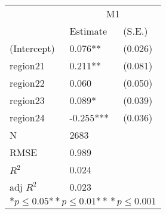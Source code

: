 \begin{tabular}{*{3}{l}}
\hline
                  & \multicolumn{2}{c}{M1}   \tabularnewline
                   &Estimate  &(S.E.)  \tabularnewline
 \hline
 \hline
   (Intercept)     &0.076**   &   (0.026) \tabularnewline
   region21        &0.211**   &   (0.081) \tabularnewline
   region22        &0.060   &   (0.050) \tabularnewline
   region23        &0.089*   &   (0.039) \tabularnewline
   region24        &-0.255***   &   (0.036) \tabularnewline
 \hline
 N                 &2683       &        \tabularnewline
 RMSE             &0.989         & \tabularnewline
 $R^2$             &0.024         & \tabularnewline
 adj $R^2$         &0.023         & \tabularnewline
 \hline
\hline
 
 \multicolumn{3}{c}{${*  p}\le 0.05$${*\!\!*  p}\le 0.01$${*\!\!*\!\!*  p}\le 0.001$}\tabularnewline
 \end{tabular}